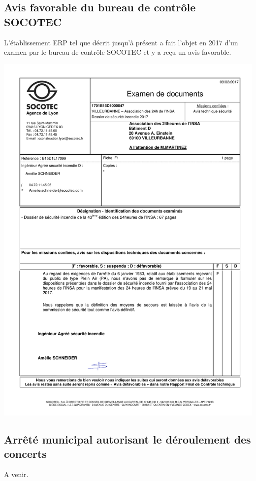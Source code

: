 \documentclass[hidelinks, paper=a4, fontsize=13pt]{report}
\begin{document}
\newpage

\subsection{Avis favorable du bureau de contrôle SOCOTEC}
L'établissement ERP tel que décrit jusqu'à présent a fait l'objet en 2017 d'un examen par le bureau de contrôle SOCOTEC et y a reçu un avis favorable.

\begin{center}
	\includegraphics[width=.75\textwidth,keepaspectratio]{Annexes/Documents/ERP2017AvisSOCOTEC}
\end{center}

\newpage

\subsection{Arrêté municipal autorisant le déroulement des concerts}

A venir. 

\newpage
\end{document}
